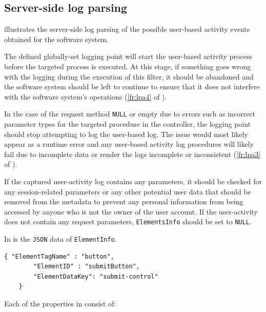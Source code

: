 \clearpage

\subsection{Server-side log parsing}
 illustrates the server-side log parsing of the possible user-based activity events obtained for the software system.\par The defined globally-set logging point will start the user-based activity process before the targeted process  is executed. At this stage, if something goes wrong with the logging during the execution of this filter, it should be abandoned and the software system should be left to continue to ensure that it does not interfere with the software system's operations (\ref{fr:lpa4} of ). \par In the case of the request method \texttt{NULL} or empty due to errors such as incorrect parameter types for the targeted procedure in the controller, the logging point should stop attempting to log the user-based log. The issue would most likely appear as a runtime error and any user-based activity log procedures will likely fail due to incomplete data or render the logs incomplete or inconsistent (\ref{fr:lpa3} of ). \par If the captured user-activity log contains any parameters, it should be checked for any session-related parameters or any other potential user data that should be removed from the metadata to prevent any personal information from being accessed by anyone who is not the owner of the user account. If the user-activity does not contain any request parameters, \texttt{ElementsInfo} should be set to \texttt{NULL}.\par In  is the \texttt{JSON} data of \texttt{ElementInfo}. 

\begin{lstlisting}[style=json, caption={\textit{Element properties JSON}}, label={fig:Ch2_ElementInfo}] 
	{ "ElementTagName" : "button",
		"ElementID" : "submitButton",
		"ElementDataKey": "submit-control"		
	}
\end{lstlisting}

Each of the properties in  consist of:

